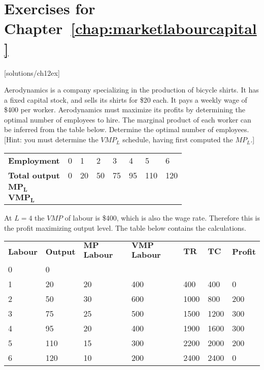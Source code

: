 \newpage
\section*{Exercises for Chapter~\ref{chap:marketlabourcapital}}

\begin{enumialphparenastyle}

[solutions/ch12ex]

\begin{ex}\label{ex:ch12ex1}
Aerodynamics is a company specializing in the production of bicycle shirts. It has a fixed capital stock, and sells its shirts for \$20 each. It pays a weekly wage of \$400 per worker. Aerodynamics must maximize its profits by determining the optimal number of employees to hire. The marginal product of each worker can be inferred from the table below. Determine the optimal number of employees. [Hint: you must determine the $VMP_L$ schedule, having first computed the $MP_L$.]
\begin{center}
\begin{tabu} to \linewidth {|X[3,c]X[1,c]X[1,c]X[1,c]X[1,c]X[1,c]X[1,c]X[1,c]|}	\hline
{}	\textbf{Employment}		&	0	&	1	&	2	&	3	&	4	&	5	&	6	\\
						\textbf{Total output}	&	0	&	20	&	50	&	75	&	95	&	110	&	120	\\
	\textbf{$\mathbf{MP_L}$}			&		&		&		&		&		&		&		\\
						\textbf{$\mathbf{VMP_L}$}		&		&		&		&		&		&		&		\\	\hline
\end{tabu}
\end{center}
\begin{sol}
	At $L=4$ the $VMP$ of labour is \$400, which is also the wage rate. Therefore this is the profit maximizing output level. The table below contains the calculations.
	\begin{center}
	\begin{tabu} to \linewidth {|X[0.7,c]X[0.7,c]X[1,c]X[1,c]X[0.7,c]X[0.7,c]X[0.7,c]|}	\hline
		\textbf{Labour} & \textbf{Output} & \textbf{$\mathbf{MP}$ Labour} & \textbf{$\mathbf{VMP}$ Labour} & \textbf{$\mathbf{TR}$} & \textbf{$\mathbf{TC}$} & \textbf{Profit}	\\
		0	&	0	&	&	&	&	&	\\
		1	&	20	&	20	&	400	&	400	&	400	&	0	\\
		2	&	50	&	30	&	600	&	1000	&	800	&	200	\\
		3	&	75	&	25	&	500	&	1500	&	1200	&	300	\\
		4	&	95	&	20	&	400	&	1900	&	1600	&	300	\\
		5	&	110	&	15	&	300	&	2200	&	2000	&	200	\\
		6	&	120	&	10	&	200	&	2400	&	2400	&	0	\\	\hline
	\end{tabu}
	\end{center}
\end{sol}
\end{ex}


\end{enumialphparenastyle}
